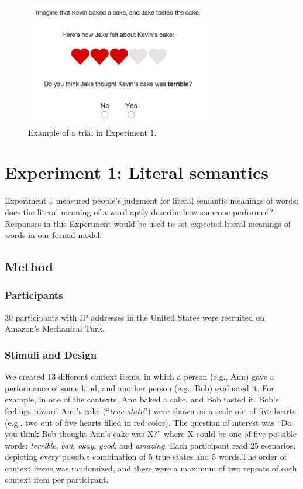 \documentclass[10pt,letterpaper]{article}
\newcommand{\ndg}[1]{\textcolor{Green}{[ndg: #1]}}
\begin{document}
\begin{figure}
\begin{centering} 
\includegraphics[width=3.2in]{figures/example.png}
\caption{\label{fig:ex} Example of a trial in Experiment 1.}
\end{centering} 
\end{figure}

\section{Experiment 1: Literal semantics}

Experiment 1 measured people's judgment for literal semantic meanings of words: 
does the literal meaning of a word aptly describe how someone performed?
Responses in this Experiment would be used to set expected literal meanings of words in our formal model.

\subsection{Method}

\subsubsection{Participants}

30 participants with IP addresses in the United States were recruited on Amazon's Mechanical Turk. 

\subsubsection{Stimuli and Design}

We created 13 different context items, in which a person (e.g., Ann) gave a performance of some kind, and another person (e.g., Bob) evaluated it. For example, in one of the contexts, Ann baked a cake, and Bob tasted it. Bob's feelings toward Ann's cake (``\emph{true state}'') were shown on a scale out of five hearts (e.g., two out of five hearts filled in red color). The question of interest was ``Do you think Bob thought Ann's cake was X?'' where X could be one of five possible words: \emph{terrible}, \emph{bad}, \emph{okay}, \emph{good}, and \emph{amazing}. Each participant read 25 scenarios, depicting every possible combination of 5 true states and 5 words.The order of context items was randomized, and there were a maximum of two repeats of each context item per participant.
\end{document}
